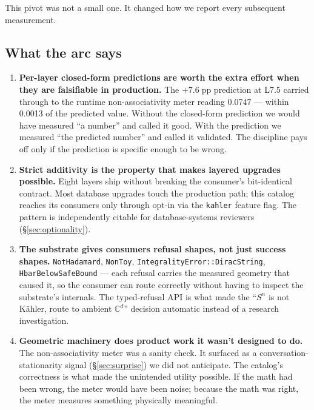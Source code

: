 \documentclass[11pt,letterpaper]{article}
\begin{document}
This pivot was not a small one. It changed how we report every
subsequent measurement.

\subsection{What the arc says}

\begin{enumerate}[nosep]
\item \textbf{Per-layer closed-form predictions are worth the extra
  effort when they are falsifiable in production.} The
  $+7.6\;\text{pp}$ prediction at L7.5 carried through to the
  runtime non-associativity meter reading 0.0747 --- within 0.0013 of
  the predicted value. Without the closed-form prediction we would
  have measured ``a number'' and called it good. With the prediction
  we measured ``the predicted number'' and called it validated. The
  discipline pays off only if the prediction is specific enough to
  be wrong.
\item \textbf{Strict additivity is the property that makes layered
  upgrades possible.} Eight layers ship without breaking the
  consumer's bit-identical contract. Most database upgrades touch the
  production path; this catalog reaches its consumers only through
  opt-in via the \texttt{kahler} feature flag. The pattern is
  independently citable for database-systems reviewers
  (\S\ref{sec:optionality}).
\item \textbf{The substrate gives consumers refusal shapes, not just
  success shapes.} \texttt{NotHadamard}, \texttt{NonToy},
  \texttt{IntegralityError::DiracString},
  \texttt{HbarBelowSafeBound} --- each refusal carries the measured
  geometry that caused it, so the consumer can route correctly
  without having to inspect the substrate's internals. The
  typed-refusal API is what made the ``$S^n$ is not K\"ahler, route
  to ambient $\mathbb{C}^d$'' decision automatic instead of a
  research investigation.
\item \textbf{Geometric machinery does product work it wasn't
  designed to do.} The non-associativity meter was a sanity check.
  It surfaced as a conversation-stationarity signal
  (\S\ref{sec:surprise}) we did not anticipate. The catalog's
  correctness is what made the unintended utility possible. If the
  math had been wrong, the meter would have been noise; because the
  math was right, the meter measures something physically
  meaningful.
\end{enumerate}


\end{document}
